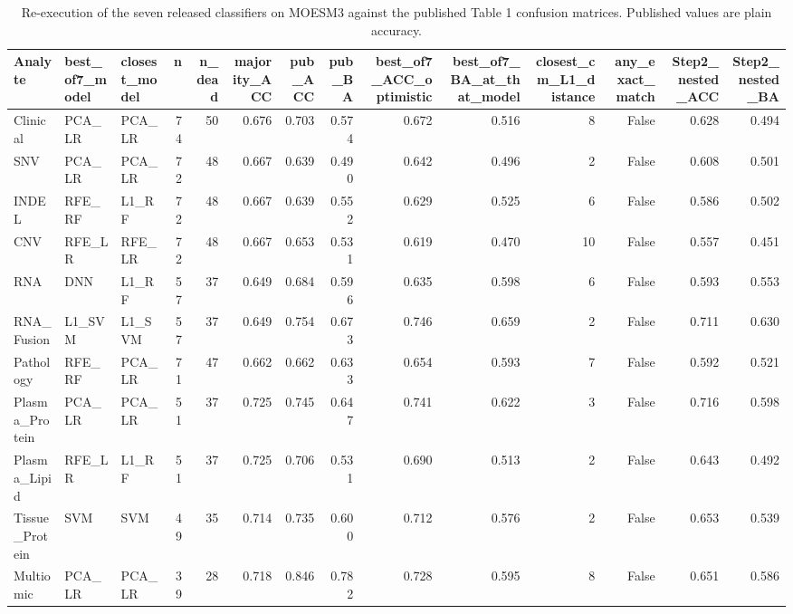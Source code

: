 \begin{table}[t]
\centering
\caption{Re-execution of the seven released classifiers on MOESM3 against the published Table 1 confusion matrices. Published values are plain accuracy.}
\begin{tabular}{lllrrrrrrrrrrr}
\hline
Analyte & best\_of7\_model & closest\_model & n & n\_dead & majority\_ACC & pub\_ACC & pub\_BA & best\_of7\_ACC\_optimistic & best\_of7\_BA\_at\_that\_model & closest\_cm\_L1\_distance & any\_exact\_match & Step2\_nested\_ACC & Step2\_nested\_BA \\
\hline
Clinical & PCA\_LR & PCA\_LR & 74 & 50 & 0.676 & 0.703 & 0.574 & 0.672 & 0.516 & 8 & False & 0.628 & 0.494 \\
SNV & PCA\_LR & PCA\_LR & 72 & 48 & 0.667 & 0.639 & 0.490 & 0.642 & 0.496 & 2 & False & 0.608 & 0.501 \\
INDEL & RFE\_RF & L1\_RF & 72 & 48 & 0.667 & 0.639 & 0.552 & 0.629 & 0.525 & 6 & False & 0.586 & 0.502 \\
CNV & RFE\_LR & RFE\_LR & 72 & 48 & 0.667 & 0.653 & 0.531 & 0.619 & 0.470 & 10 & False & 0.557 & 0.451 \\
RNA & DNN & L1\_RF & 57 & 37 & 0.649 & 0.684 & 0.596 & 0.635 & 0.598 & 6 & False & 0.593 & 0.553 \\
RNA\_Fusion & L1\_SVM & L1\_SVM & 57 & 37 & 0.649 & 0.754 & 0.673 & 0.746 & 0.659 & 2 & False & 0.711 & 0.630 \\
Pathology & RFE\_RF & PCA\_LR & 71 & 47 & 0.662 & 0.662 & 0.633 & 0.654 & 0.593 & 7 & False & 0.592 & 0.521 \\
Plasma\_Protein & PCA\_LR & PCA\_LR & 51 & 37 & 0.725 & 0.745 & 0.647 & 0.741 & 0.622 & 3 & False & 0.716 & 0.598 \\
Plasma\_Lipid & RFE\_LR & L1\_RF & 51 & 37 & 0.725 & 0.706 & 0.531 & 0.690 & 0.513 & 2 & False & 0.643 & 0.492 \\
Tissue\_Protein & SVM & SVM & 49 & 35 & 0.714 & 0.735 & 0.600 & 0.712 & 0.576 & 2 & False & 0.653 & 0.539 \\
Multiomic & PCA\_LR & PCA\_LR & 39 & 28 & 0.718 & 0.846 & 0.782 & 0.728 & 0.595 & 8 & False & 0.651 & 0.586 \\
\hline
\end{tabular}
\end{table}
